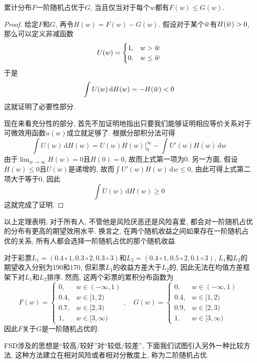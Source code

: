 \documentclass[cn, 12pt, math=mtpro2, bibstyle=apa, blue]{elegantbook}
\newcommand{\overbar}[1]{\mkern 1.5mu\overline{\mkern-1.5mu#1\mkern-1.5mu}\mkern 1.5mu}
\begin{document}
\begin{theorem}
  累计分布$F$一阶随机占优于$G$, 当且仅当对于每个$w$都有$F(w)\leq G(w)$.
\end{theorem}
\begin{proof}
  给定$F$和$G$, 再令$H(w)=F(w)-G(w)$. 假设对于某个$\overbar{w}$有$H(\overbar{w})>0$, 那么可以定义非减函数
  $$U(w)=\begin{cases}
           1, & w>\overbar{w} \\
           0, & w\leq\overbar{w}
         \end{cases}$$
  于是
  $$\int U(w)\,\text{d}H(w)=-H(\overbar{w})<0$$
  这就证明了必要性部分.
  
  现在来看充分性的部分, 首先不加证明地指出只要我们能够证明相应等价关系对于可微效用函数$u(w)$成立就足够了. 根据分部积分法可得
  $$\int U(w)\,\text{d}H(w)=\left.U(w)H(w)\right|_0^\infty-\int U'(w)H(w)\,\text{d}w$$
  由于$\displaystyle \lim_{w\to\infty}H(w)=0$且$H(0)=0$, 故而上式第一项为0. 另一方面, 假设$H(w)\leq0$且$U(w)$是递增的, 故而$\int U'(w)H(w)\,\text{d}w\leq0$, 由此可得上式第二项大于等于0, 因此
  $$\int U(w)\,\text{d}H(w)\ge0$$
  这就完成了证明.
\end{proof}
以上定理表明, 对于所有人, 不管他是风险厌恶还是风险喜爱, 都会对一阶随机占优的分布有更高的期望效用水平. 换言之, 在两个随机收益之间如果存在一阶随机占优的关系, 所有人都会选择一阶随机占优的那个随机收益.
\begin{example}
对于彩票$L_1=(0.4\circ 1, 0.3\circ 2, 0.3\circ 3)$和$L_2=(0.4\circ 1, 0.5\circ2, 0.1\circ 3)$, $L_1$和$L_2$的期望收入分别为190和170, 但彩票$L_1$的收益方差大于$L_2$的, 因此无法在均值方差框架下对$L_1$和$L_2$排序. 然而, 这两个彩票的累积分布函数为
$$F(w)=\begin{cases}
         0, & w\in (-\infty,1) \\
         0.4, & w\in [1,2) \\
         0.7, & w\in [2,3) \\
         1, & w\in[3,\infty)
       \end{cases},\quad G(w)=\begin{cases}
         0, & w\in (-\infty,1) \\
         0.4, & w\in [1,2) \\
         0.9, & w\in [2,3) \\
         1, & w\in[3,\infty)
       \end{cases}$$
因此$F$关于$G$是一阶随机占优的.
\end{example}

FSD涉及的思想是“较高/较好”对“较低/较差”, 下面我们试图引入另外一种比较方法, 这种方法建立在相对风险或者相对分散度上, 称为二阶随机占优.
\end{document}
